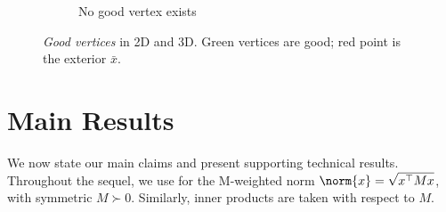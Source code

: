 \begin{figure}[h!]
{\begin{minipage}{0.95\textwidth}
\begin{subfigure}[b]{0.3\textwidth}
\caption{No good vertex exists}
\end{subfigure}

\caption{\emph{Good vertices} in 2D and 3D. Green vertices are good; red point is the exterior $\bar{x}$.}
\end{minipage}
} %
\end{figure}


\section{Main Results}\label{sec:main_results}

We now state our main claims and present supporting technical results. Throughout the sequel, we use for the M-weighted norm $\norm{x} = \sqrt{x^\top M x}$, with symmetric $M \succ 0$. Similarly, inner products are taken with respect to $M$.

